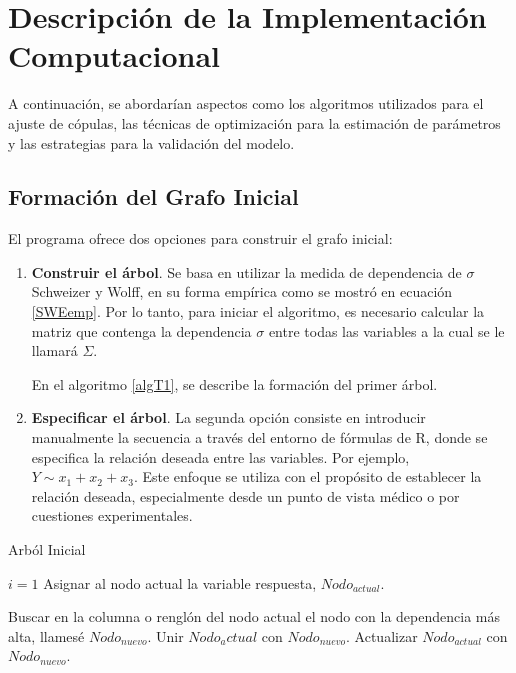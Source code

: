 \section{Descripción de la Implementación Computacional}

A continuación, se abordarían aspectos como los algoritmos utilizados para el ajuste de cópulas, las técnicas de optimización para la estimación de parámetros y las estrategias para la validación del modelo. 

\subsection{Formación del Grafo Inicial}

El programa ofrece dos opciones para construir el grafo inicial:

\begin{enumerate}
    \item \textbf{Construir el árbol}. Se basa en utilizar la medida de dependencia de $\sigma$ Schweizer y Wolff, en su forma empírica como se mostró en ecuación \eqref{SWEemp}. Por lo tanto, para iniciar el algoritmo, es necesario calcular la matriz que contenga la dependencia $\sigma$ entre todas las variables a la cual se le llamará $\Sigma$.

    En el algoritmo \ref{algT1}, se describe la formación del primer árbol.

    \item \textbf{Especificar el árbol}. La segunda opción consiste en introducir manualmente la secuencia a través del entorno de fórmulas de R, donde se especifica la relación deseada entre las variables. Por ejemplo, $Y \sim x_1 + x_2 + x_3$. Este enfoque se utiliza con el propósito de establecer la relación deseada, especialmente desde un punto de vista médico o  por cuestiones experimentales.
\end{enumerate}

\begin{algorithm}[H]
      \caption{Arból Inicial}
      \label{algT1}
      \begin{algorithmic}[1]  
        
        \State $i = 1$
        \State Asignar al nodo actual la variable respuesta, $Nodo_{actual}$.
        
          \State Buscar en la columna o renglón del nodo actual el nodo con la dependencia más alta, llamesé $Nodo_{nuevo}$.
          \State Unir $Nodo_actual$ con $Nodo_{nuevo}$.
          \State Actualizar $Nodo_{actual}$ con $Nodo_{nuevo}$.     
        \EndWhile
       
      \end{algorithmic}
    \end{algorithm}

